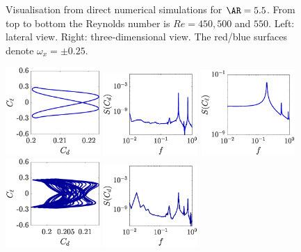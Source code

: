 \begin{figure}
  \caption{Visualisation from direct numerical simulations for $\AR=5.5$. From top to bottom the Reynolds number is $Re=450,500$ and $550$. Left: lateral view. Right: three-dimensional view. The red/blue surfaces denote $\omega_x = \pm 0.25$.}
  \label{fig:viewdns-ar5p5}       
\end{figure}

\begin{figure}
  \centering
  \includegraphics[width=0.32\textwidth]{./fig/AR5p5/cl_cd_Re450.eps}
  \includegraphics[width=0.32\textwidth]{./fig/AR5p5/cd_f_Re450.eps} 
  \includegraphics[width=0.32\textwidth]{./fig/AR5p5/cl_f_Re450.eps}
  \includegraphics[width=0.32\textwidth]{./fig/AR5p5/cl_cd_Re500.eps}
  \includegraphics[width=0.32\textwidth]{./fig/AR5p5/cd_f_Re500.eps} 

\end{figure}

